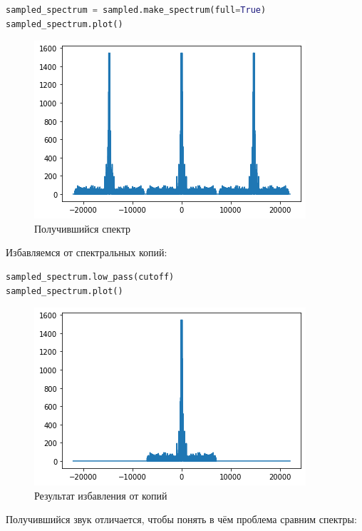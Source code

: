 \begin{lstlisting}[language=Python]
sampled_spectrum = sampled.make_spectrum(full=True)
sampled_spectrum.plot()
\end{lstlisting}
\begin{figure}[H]
	\begin{center}
		\includegraphics[scale=1]{fig/lab11/lab11_16_0.png}
		\caption{Получившийся спектр}
	\end{center}
\end{figure}

Избавляемся от спектральных копий:
\begin{lstlisting}[language=Python]
sampled_spectrum.low_pass(cutoff)
sampled_spectrum.plot()
\end{lstlisting}
\begin{figure}[H]
	\begin{center}
		\includegraphics[scale=1]{fig/lab11/lab11_18_0.png}
		\caption{Результат избавления от копий}
	\end{center}
\end{figure}

Получившийся звук отличается, чтобы понять в чём проблема сравним спектры:

